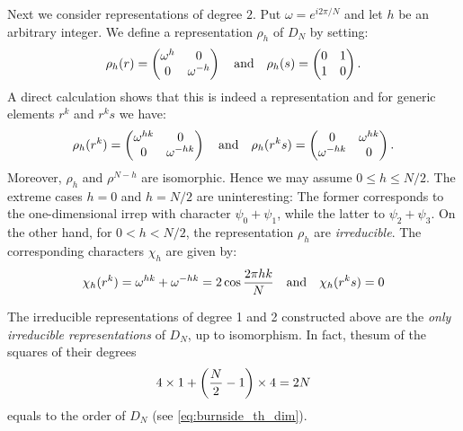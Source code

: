 Next we consider representations of degree $2$.
Put $\omega = e^{i 2 \pi / N}$ and let $h$ be an arbitrary integer.
We define a representation $\rho_h$ of $D_N$ by setting:
\begin{equation}
    \rho_h(r) =
    \begin{pmatrix}
        \omega^{h} & 0 \\
        0 & \omega^{-h}
    \end{pmatrix}
    \qand
    \rho_h(s) =
    \begin{pmatrix}
        0 & 1 \\ 1 & 0
    \end{pmatrix}.
    \label{eq:irreps_2d_DN}
\end{equation}
A direct calculation shows that this is indeed a representation and for generic elements $r^k$ and $r^k s$ we have:
\begin{equation}
    \rho_h(r^k) =
    \begin{pmatrix}
        \omega^{hk} & 0 \\
        0 & \omega^{-hk}
    \end{pmatrix}
    \qand
    \rho_h(r^k s) =
    \begin{pmatrix}
        0 & \omega^{hk} \\ \omega^{-hk} & 0
    \end{pmatrix}.
\end{equation}
Moreover, $\rho_h$ and $\rho^{N-h}$ are isomorphic.
Hence we may assume $0 \leq h \leq N/2$.
The extreme cases $h=0$ and $h=N/2$ are uninteresting:
The former corresponds to the one-dimensional irrep with character $\psi_0 + \psi_1$, while the latter to $\psi_2 + \psi_3$.
On the other hand, for $0 < h < N/2$, the representation $\rho_h$ are \emph{irreducible}.
The corresponding characters $\chi_h$ are given by:
\begin{equation}
    \chi_h(r^k) = \omega^{hk} + \omega^{-hk} = 2 \cos \frac{2 \pi hk}{N}
    \qand
    \chi_h(r^k s) = 0
    \label{eq:chars_2d_DN}
\end{equation}

The irreducible representations of degree 1 and 2 constructed above are the \emph{only irreducible representations} of $D_N$, up to isomorphism.
In fact, thesum of the squares of their degrees
\begin{equation*}
    4 \times 1 + \qty( \frac{N}{2} - 1  ) \times 4 = 2N
\end{equation*}
equals to the order of $D_N$ (see \eqref{eq:burnside_th_dim}).



